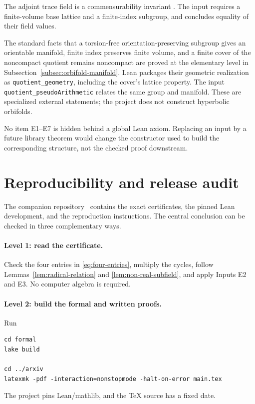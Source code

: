 \documentclass[11pt]{article}
\numberwithin{equation}{section}
\theoremstyle{definition}
\theoremstyle{remark}
\newcommand{\code}[1]{\texttt{#1}}
\begin{document}
\begin{description}[style=nextline]
\item[\textbf{E6: Finite-index trace-field invariance.}]
The adjoint trace field is a commensurability invariant
\cite{VinbergRings}.  The input  requires
a finite-volume base lattice and a finite-index subgroup, and concludes
equality of their field values.

\item[\textbf{E7: Finite-cover quotient geometry.}]
The standard facts that a torsion-free orientation-preserving subgroup gives
an orientable manifold, finite index preserves finite volume, and a finite
cover of the noncompact quotient remains noncompact are proved at the
elementary level in Subsection~\ref{subsec:orbifold-manifold}.  Lean packages
their geometric realization as \code{quotient\_geometry}, including the
cover's lattice property.  The input \code{quotient\_pseudoArithmetic}
relates the same group and manifold.  These are specialized external
statements; the project does not construct hyperbolic orbifolds.
\end{description}

No item E1--E7 is hidden behind a global Lean axiom.  Replacing an input by a
future library theorem would change the constructor used to build the
corresponding structure, not the checked proof downstream.

\section{Reproducibility and release audit}
\label{sec:reproducibility}

The companion repository~\cite{Repository} contains the exact certificates,
the pinned Lean development, and the reproduction instructions.  The central
conclusion can be checked in three complementary ways.

\paragraph{Level 1: read the certificate.}
Check the four entries in \eqref{eq:four-entries}, multiply the cycles,
follow Lemmas~\ref{lem:radical-relation} and
\ref{lem:non-real-subfield}, and apply Inputs E2 and E3.  No computer algebra
is required.

\paragraph{Level 2: build the formal and written proofs.}
Run
\begin{verbatim}
cd formal
lake build

cd ../arxiv
latexmk -pdf -interaction=nonstopmode -halt-on-error main.tex
\end{verbatim}
The project pins Lean/mathlib, and the TeX source has a fixed date.
\end{document}
